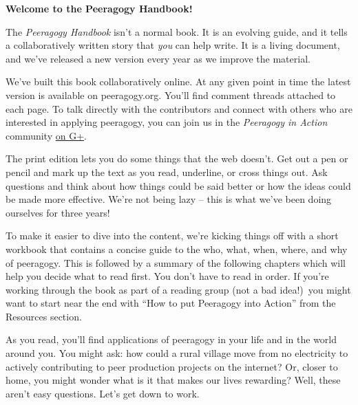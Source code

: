 \textbf{Welcome to the Peeragogy Handbook!}

The \emph{Peeragogy Handbook} isn't a normal book.  It is an evolving
guide, and it tells a collaboratively written story that \emph{you}
can help write.  It is a living document, and we've released a new
version every year as we improve the material.   

We've built this book collaboratively online.  At any given point in
time the latest version is available on peeragogy.org.  You'll find
comment threads attached to each page.  To talk directly with the
contributors and connect with others who are interested in applying
peeragogy, you can join us in the \emph{Peeragogy in Action}
community \href{https://plus.google.com/communities/107386162349686249470}{on
G+}.

The print edition lets you do some things that the web doesn't.  Get
out a pen or pencil and mark up the text as you read, underline, or
cross things out.  Ask questions and think about how things could be
said better or how the ideas could be made more effective.  We're not
being lazy -- this is what we've been doing ourselves for three years!

To make it easier to dive into the content, we're kicking things off
with a short workbook that contains a concise guide to the who, what,
when, where, and why of peeragogy.  This is followed by a summary of
the following chapters which will help you decide what to read first.
You don't have to read in order.  If you're working through the book
as part of a reading group (not a bad idea!)~you might want to start
near the end with ``How to put Peeragogy into Action'' from the
Resources section.

As you read, you'll find applications of peeragogy in your life and in
the world around you.  You might ask: how could a rural village move
from no electricity to actively contributing to peer production
projects on the internet?  Or, closer to home, you might wonder what
is it that makes our lives rewarding?  Well, these aren't easy
questions.  Let's get down to work.

